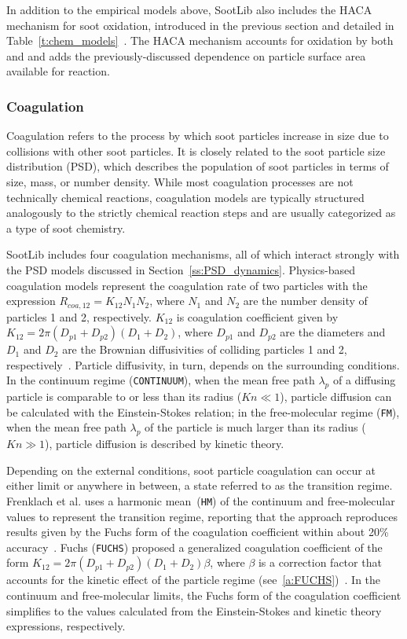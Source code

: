 \documentclass[preprint,letterpaper]{elsarticle}
\begin{document}
In addition to the empirical models above, SootLib also includes the HACA mechanism for soot oxidation, introduced in the previous section and detailed in Table~\ref{t:chem_models}~\cite{Appel_2000}. The HACA mechanism accounts for oxidation by both  and  and adds the previously-discussed dependence on particle surface area available for reaction.

\subsubsection{Coagulation}
\label{sss:coa}

Coagulation refers to the process by which soot particles increase in size due to collisions with other soot particles. It is closely related to the soot particle size distribution (PSD), which describes the population of soot particles in terms of size, mass, or number density. While most coagulation processes are not technically chemical reactions, coagulation models are typically structured analogously to the strictly chemical reaction steps and are usually categorized as a type of soot chemistry.

SootLib includes four coagulation mechanisms, all of which interact strongly with the PSD models discussed in Section~\ref{ss:PSD_dynamics}. Physics-based coagulation models represent the coagulation rate of two particles with the expression $R_{coa,12}=K_{12}N_1N_2$, where $N_1$ and $N_2$ are the number density of particles 1 and 2, respectively. $K_{12}$ is coagulation coefficient given by $K_{12}=2\pi (D_{p1}+D_{p2})(D_1+D_2)$, where $D_{p1}$ and $D_{p2}$ are the diameters and $D_1$ and $D_2$ are the Brownian diffusivities of colliding particles 1 and 2, respectively~\cite{Seinfeld_2016}. Particle diffusivity, in turn, depends on the surrounding conditions. In the continuum regime (\texttt{CONTINUUM}), when the mean free path $\lambda_p$ of a diffusing particle is comparable to or less than its radius ($Kn\ll1$), particle diffusion can be calculated with the Einstein-Stokes relation; in the free-molecular regime (\texttt{FM}), when the mean free path $\lambda_p$ of the particle is much larger than its radius ($Kn\gg1$), particle diffusion is described by kinetic theory.

Depending on the external conditions, soot particle coagulation can occur at either limit or anywhere in between, a state referred to as the transition regime. Frenklach et al. uses a harmonic mean~(\texttt{HM}) of the continuum and free-molecular values to represent the transition regime, reporting that the approach reproduces results given by the Fuchs form of the coagulation coefficient within about 20\% accuracy~\cite{Frenklach_2002b,Kazakov_1998}. Fuchs (\texttt{FUCHS}) proposed a generalized coagulation coefficient of the form $K_{12}=2\pi (D_{p1}+D_{p2})(D_1+D_2)\beta$, where $\beta$ is a correction factor that accounts for the kinetic effect of the particle regime (see~\ref{a:FUCHS})~\cite{Fuchs_1964, Seinfeld_2016}. In the continuum and free-molecular limits, the Fuchs form of the coagulation coefficient simplifies to the values calculated from the Einstein-Stokes and kinetic theory expressions, respectively.
\end{document}

